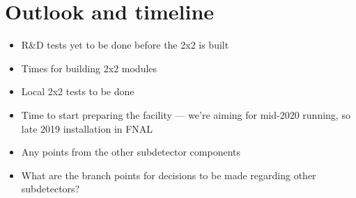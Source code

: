 \section{Outlook and timeline}
\label{sec:outlook}

\begin{itemize}
\item R\&D tests yet to be done before the 2x2 is built
\item Times for building 2x2 modules
\item Local 2x2 tests to be done
\item Time to start preparing the facility --- we're aiming for mid-2020 running, so late 2019 installation in FNAL
\item Any points from the other subdetector components
\item What are the branch points for decisions to be made regarding other subdetectors?
\end{itemize}
